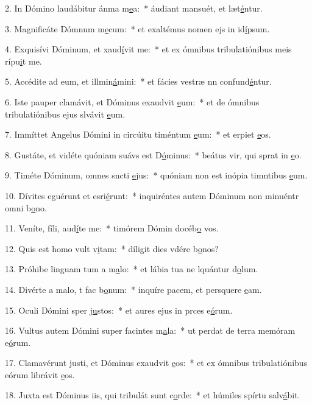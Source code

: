 2. In Dómino laudábitur ánma m\uline{e}a:~* áudiant mansuét, et læt\uline{é}ntur.\par 
3. Magnificáte Dómnum m\uline{e}cum:~* et exaltémus nomen ejs in id\uline{í}psum.\par 
4. Exquisívi Dóminum, et xaud\uline{í}vit me:~* et ex ómnibus tribulatiónibus meis rípu\uline{i}t me.\par 
5. Accédite ad eum, et illmin\uline{á}mini:~* et fácies vestræ nn confund\uline{é}ntur.\par 
6. Iste pauper clamávit, et Dóminus exaudvit \uline{e}um:~* et de ómnibus tribulatiónibus ejus slvávit \uline{e}um.\par 
7. Immíttet Angelus Dómini in circúitu timéntum \uline{e}um:~* et erpiet \uline{e}os.\par 
8. Gustáte, et vidéte quóniam suávs est D\uline{ó}minus:~* beátus vir, qui sprat in \uline{e}o.\par 
9. Timéte Dóminum, omnes sncti \uline{e}jus:~* quóniam non est inópia timntibus \uline{e}um.\par 
10. Dívites eguérunt et esri\uline{é}runt:~* inquiréntes autem Dóminum non minuéntr omni b\uline{o}no.\par 
11. Veníte, fíli, aud\uline{í}te me:~* timórem Dómin docéb\uline{o} vos.\par 
12. Quis est homo  vult v\uline{i}tam:~* díligit dies vdére b\uline{o}nos?\par 
13. Próhibe linguam tum a m\uline{a}lo:~* et lábia tua ne lquántur d\uline{o}lum.\par 
14. Divérte a malo, t fac b\uline{o}num:~* inquíre pacem, et persquere \uline{e}am.\par 
15. Oculi Dómini sper j\uline{u}stos:~* et aures ejus in prces e\uline{ó}rum.\par 
16. Vultus autem Dómini super facintes m\uline{a}la:~* ut perdat de terra memóram e\uline{ó}rum.\par 
17. Clamavérunt justi, et Dóminus exaudvit \uline{e}os:~* et ex ómnibus tribulatiónibus eórum librávit \uline{e}os.\par 
18. Juxta est Dóminus iis, qui tribulát sunt c\uline{o}rde:~* et húmiles spírtu salv\uline{á}bit.\par 
